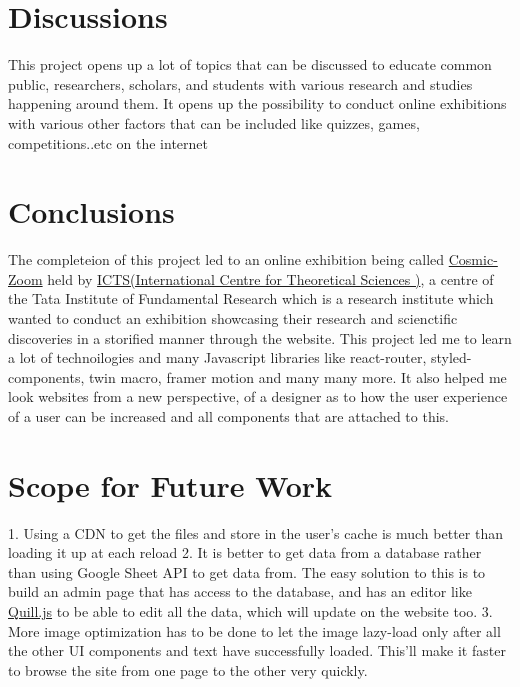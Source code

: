 \section{Discussions}
This project opens up a lot of topics that can be discussed to educate common public, researchers, scholars, and students with various research and studies happening around them. It opens up the possibility to conduct online exhibitions with various other factors that can be included like quizzes, games, competitions..etc on  the internet 

\section{Conclusions}
The completeion of this project led to an online exhibition being called \href{https://cosmic-zoom.in/}{Cosmic-Zoom} held by \href{https://www.icts.res.in/}{ICTS(International Centre for Theoretical Sciences
)}, a centre of the Tata Institute of Fundamental Research which is a research institute which wanted to conduct an exhibition showcasing their research and scienctific discoveries in a storified manner through the website. 
This project led me to learn a lot of technoilogies and many Javascript libraries like react-router, styled-components, twin macro, framer motion and many many more. It also helped me look websites from a new perspective, of a designer as to how the user experience of a user can be increased and all components that are attached to this.


\section{Scope for Future Work}

1. Using a CDN to get the files and store in the user's cache is much better than loading it up at each reload
2. It is better to get data from a database rather than using Google Sheet API to get data from. The easy solution to this is to build an admin page that has access to the database, and has an editor like \href{https://quilljs.com/}{Quill.js} to be able to edit all the data, which will update on the website too.
3. More image optimization has to be done to let the image lazy-load only after all the other UI components and text have successfully loaded. This'll make it faster to browse the site from one page to the other very quickly.
 



	
	






